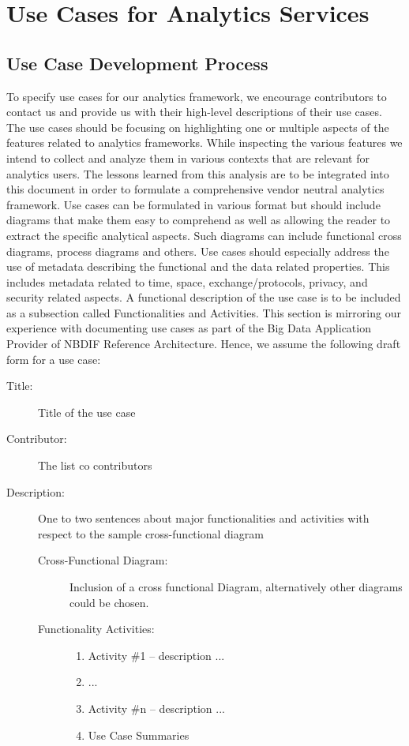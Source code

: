 
\section{Use Cases for Analytics Services}
\label{sec:usecases}


\subsection{Use Case Development Process}

To specify use cases for our analytics framework, we encourage contributors to contact us and provide us with their high-level descriptions of their use cases. The use cases should be focusing on highlighting one or multiple aspects of the features related to analytics frameworks. While inspecting the various features we intend to collect and analyze them in various contexts that are relevant for analytics users. The lessons learned from this analysis are to be integrated into this document in order to formulate a comprehensive vendor neutral analytics framework.
Use cases can be formulated in various format but should include diagrams that make them easy to comprehend as well as allowing the reader to extract the specific analytical aspects. Such diagrams can include functional cross diagrams, process diagrams and others.
Use cases should especially address the use of metadata describing the functional and the data related properties. This includes metadata related to time, space, exchange/protocols, privacy, and security related aspects.
A functional description of the use case is to be included as a subsection called Functionalities and Activities. This section is mirroring our experience with documenting use cases as part of the Big Data Application Provider of NBDIF Reference Architecture. Hence, we assume the following draft form for a use case:

\begin{description}
\item[Title:] 		Title of the use case
\item[Contributor:] 	The list co contributors
\item[Description:] 	One to two sentences about major functionalities and activities with respect to the sample cross-functional diagram
	
	\begin{description}
	\item[Cross-Functional Diagram:]
		Inclusion of a cross functional Diagram, alternatively other diagrams could be 			chosen.
	\item[Functionality Activities:]
	\begin{enumerate}
        \item Activity \#1 -- description ...
        \item ...
        \item Activity \#n -- description ...
    	\item Use Case Summaries
    \end{enumerate}
\end{description}
\end{description}

